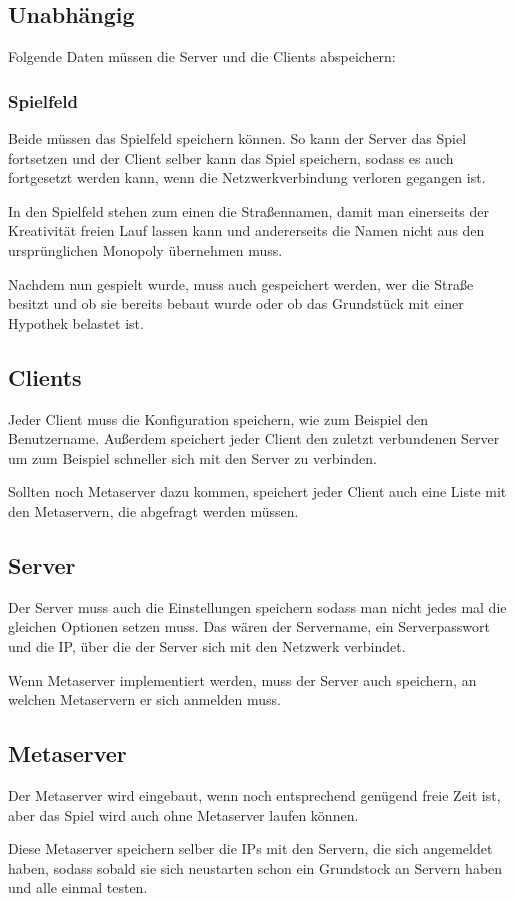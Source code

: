 \documentclass[a4paper,10pt]{article}
\begin{document}
\subsection{Unabhängig}
Folgende Daten müssen die Server und die Clients abspeichern:
\subsubsection{Spielfeld}
Beide müssen das Spielfeld speichern können. So kann der Server das Spiel fortsetzen und der Client selber kann das Spiel speichern, sodass es auch fortgesetzt werden kann, wenn die Netzwerkverbindung verloren gegangen ist.

In den Spielfeld stehen zum einen die Straßennamen, damit man einerseits der Kreativität freien Lauf lassen kann und andererseits die Namen nicht aus den ursprünglichen Monopoly übernehmen muss.

Nachdem nun gespielt wurde, muss auch gespeichert werden, wer die Straße besitzt und ob sie bereits bebaut wurde oder ob das Grundstück mit einer Hypothek belastet ist.
\subsection{Clients}
Jeder Client muss die Konfiguration speichern, wie zum Beispiel den Benutzername. Außerdem speichert jeder Client den zuletzt verbundenen Server um zum Beispiel schneller sich mit den Server zu verbinden.

Sollten noch Metaserver dazu kommen, speichert jeder Client auch eine Liste mit den Metaservern, die abgefragt werden müssen.
\subsection{Server}
Der Server muss auch die Einstellungen speichern sodass man nicht jedes mal die gleichen Optionen setzen muss. Das wären der Servername, ein Serverpasswort und die IP, über die der Server sich mit den Netzwerk verbindet.

Wenn Metaserver implementiert werden, muss der Server auch speichern, an welchen Metaservern er sich anmelden muss.
\subsection{Metaserver}
Der Metaserver wird eingebaut, wenn noch entsprechend genügend freie Zeit ist, aber das Spiel wird auch ohne Metaserver laufen können.

Diese Metaserver speichern selber die IPs mit den Servern, die sich angemeldet haben, sodass sobald sie sich neustarten schon ein Grundstock an Servern haben und alle einmal testen.
\end{document}
